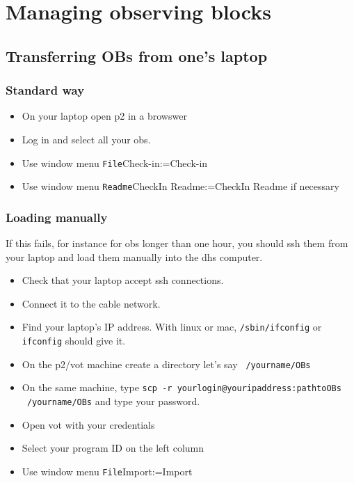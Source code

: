 \documentclass[11pt,fleqn,a4paper]{book}
\makeatletter
\def\menu#1#2{\texttt{#1}\ifx{}#2\else\@for\@x:=#2\do{$\rightarrow$\texttt{\@x}}\fi}
\def\wmenu#1#2{window menu \menu{#1}{#2}}
\makeatother
\begin{document}

\chapter{Managing observing blocks}
\label{chap:ob}

\section{Transferring OBs from one's laptop}

\subsection{Standard way}

\begin{itemize}
    \item On your laptop open \gls{p2} in a browswer
    \item Log in and select all your \glspl{ob}.
    \item Use \wmenu{File}{Check-in}
    \item Use \wmenu{Readme}{CheckIn Readme} if necessary
\end{itemize}

\subsection{Loading manually}
If this fails, for instance for \glspl{ob} longer than one hour, you should
ssh them from your laptop and load them manually into the dhs computer.

\begin{itemize}
  \item Check that your laptop accept ssh connections.
  \item Connect it to the cable network.
  \item Find your laptop's IP address.  With linux or mac, 
        \texttt{/sbin/ifconfig} or \texttt{ifconfig} should give it.
  \item On the \gls{p2}/\gls{vot} machine create a directory let's say \texttt{~/yourname/OBs} 
  \item On the same machine, type \texttt{scp -r yourlogin@youripaddress:pathtoOBs ~/yourname/OBs}
        and type your password.
  \item Open \gls{vot} with your credentials
  \item Select your program ID on the left column
  \item Use \wmenu{File}{Import}
\end{itemize}
\end{document}
